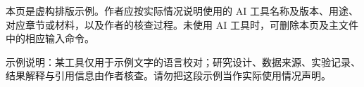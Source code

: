 \begin{aideclaration}
本页是虚构排版示例。作者应按实际情况说明使用的 AI 工具名称及版本、用途、对应章节或材料，以及作者的核查过程。未使用 AI 工具时，可删除本页及主文件中的相应输入命令。

示例说明：某工具仅用于示例文字的语言校对；研究设计、数据来源、实验记录、结果解释与引用信息由作者核查。请勿把这段示例当作实际使用情况声明。
\end{aideclaration}
